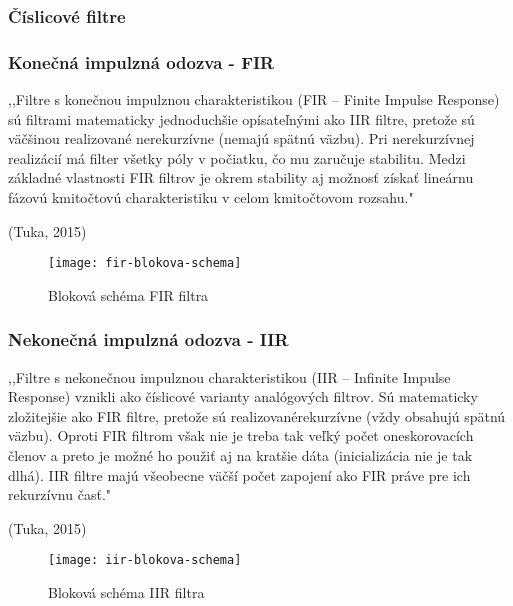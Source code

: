 \documentclass[titlepage,12pt]{article}
\begin{document}
\newpage
\subsubsection{Číslicové filtre}

\subsubsection*{Konečná impulzná odozva - FIR}
,,Filtre s konečnou impulznou charakteristikou (FIR – Finite Impulse Response) sú filtrami  matematicky  jednoduchšie  opísateľnými  ako  IIR  filtre,  pretože  sú  väčšinou realizované nerekurzívne (nemajú spätnú väzbu). Pri nerekurzívnej realizácií má filter všetky póly v počiatku, čo mu zaručuje stabilitu. Medzi základné vlastnosti FIR filtrov je okrem stability aj možnosť získať lineárnu fázovú kmitočtovú charakteristiku v celom kmitočtovom rozsahu." 
\begin{flushright}
(Tuka, 2015)
\end{flushright}

\begin{figure}[!ht]
\begin{center}
\texttt{[image: fir-blokova-schema]}
\caption{Bloková schéma FIR filtra}
\end{center}
\end{figure}

\subsubsection*{Nekonečná impulzná odozva - IIR}
,,Filtre s nekonečnou impulznou charakteristikou (IIR – Infinite Impulse Response) vznikli ako číslicové varianty analógových filtrov. Sú matematicky zložitejšie ako FIR filtre, pretože  sú  realizovanérekurzívne  (vždy  obsahujú  spätnú  väzbu).  Oproti  FIR filtrom však nie je treba tak veľký počet oneskorovacích členov a preto je možné ho použiť aj na kratšie dáta (inicializácia nie je tak dlhá). IIR filtre majú všeobecne väčší počet zapojení ako FIR práve pre ich rekurzívnu časť."
\begin{flushright}
(Tuka, 2015)
\end{flushright}
\begin{figure}[!ht]
\begin{center}
\texttt{[image: iir-blokova-schema]}
\caption{Bloková schéma IIR filtra}
\end{center}
\end{figure}
\end{document}
